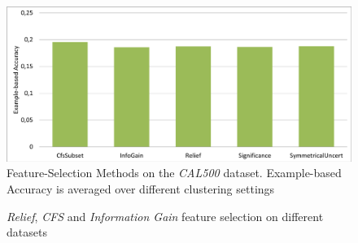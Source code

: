 		\begin{figure}
			\centering
			\includegraphics[width=.9\textwidth]{figures/five_fs.pdf}
			\caption{Feature-Selection Methods on the \textit{CAL500} dataset. Example-based Accuracy is averaged over different clustering settings}
			\label{fig:fscal}
		\end{figure}
				
		\begin{figure}
			\centering			
			\caption{\textit{Relief}, \textit{CFS} and \textit{Information Gain} feature selection on different datasets}
			\label{fig:fs}
		\end{figure}

